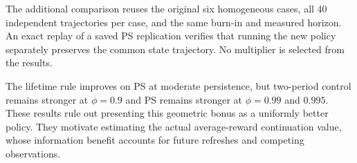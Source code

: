 The additional comparison reuses the original six homogeneous cases, all 40 independent trajectories per case, and the same burn-in and measured horizon. An exact replay of a saved PS replication verifies that running the new policy separately preserves the common state trajectory. No multiplier is selected from the results.
\begin{table}[ht]
\centering
\caption{Additional common-trajectory comparison. Smaller coefficients are better; positive paired PS minus KG differences favor KG. Intervals are approximate 95\% intervals.}
\end{table}

The lifetime rule improves on PS at moderate persistence, but two-period control remains stronger at $\phi=0.9$ and PS remains stronger at $\phi=0.99$ and $0.995$. These results rule out presenting this geometric bonus as a uniformly better policy. They motivate estimating the actual average-reward continuation value, whose information benefit accounts for future refreshes and competing observations.
